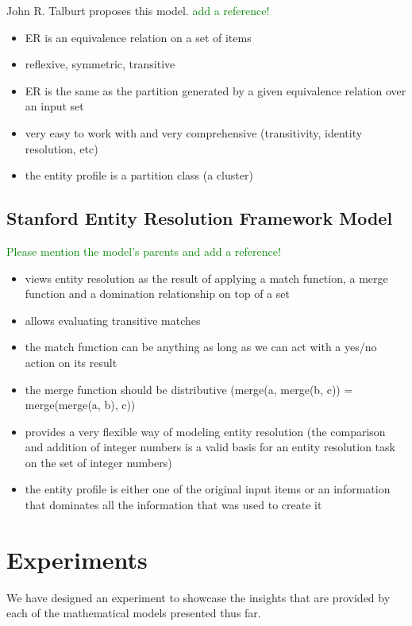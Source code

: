 \documentclass[11pt]{article}
\begin{document}
    John R. Talburt proposes this model. 
    \textcolor{green}{add a reference!}
    \begin{itemize}
        \item ER is an equivalence relation on a set of items
        \item reflexive, symmetric, transitive
        \item ER is the same as the partition generated by a given equivalence relation over an input set
        \item very easy to work with and very comprehensive (transitivity, identity resolution, etc)
        \item the entity profile is a partition class (a cluster)
    \end{itemize}

    \subsection[serf]{Stanford Entity Resolution Framework Model}\label{subsec:serf}

    \textcolor{green}{Please mention the model's parents and add a reference!}
    \begin{itemize}
        \item views entity resolution as the result of applying a match function, a merge function and a domination relationship on top of a set
        \item allows evaluating transitive matches
        \item the match function can be anything as long as we can act with a yes/no action on its result
        \item the merge function should be distributive (merge(a, merge(b, c)) = merge(merge(a, b), c))
        \item provides a very flexible way of modeling entity resolution (the comparison and addition of integer numbers is a valid basis for an entity resolution task on the set of integer numbers)
        \item the entity profile is either one of the original input items or an information that dominates all the information that was used to create it
    \end{itemize}

    \section{Experiments}

    We have designed an experiment to showcase the insights that are provided by
    each of the mathematical models presented thus far.
\end{document}
